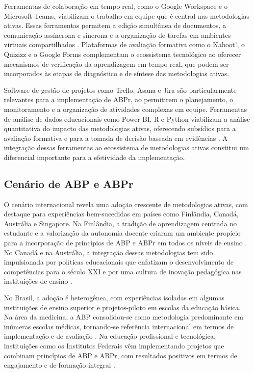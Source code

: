 Ferramentas de colaboração em tempo real, como o Google Workspace e o Microsoft Teams, viabilizam o trabalho em equipe que é central nas metodologias ativas. Essas ferramentas permitem a edição simultânea de documentos, a comunicação assíncrona e síncrona e a organização de tarefas em ambientes virtuais compartilhados \cite{SELWYN2022}. Plataformas de avaliação formativa como o Kahoot!, o Quizizz e o Google Forms complementam o ecossistema tecnológico ao oferecer mecanismos de verificação da aprendizagem em tempo real, que podem ser incorporados às etapas de diagnóstico e de síntese das metodologias ativas.

Software de gestão de projetos como Trello, Asana e Jira são particularmente relevantes para a implementação de ABPr, ao permitirem o planejamento, o monitoramento e a organização de atividades complexas em equipe. Ferramentas de análise de dados educacionais como Power BI, R e Python viabilizam a análise quantitativa do impacto das metodologias ativas, oferecendo subsídios para a avaliação formativa e para a tomada de decisão baseada em evidências \cite{ALMEIDA2024}. A integração dessas ferramentas ao ecossistema de metodologias ativas constitui um diferencial importante para a efetividade da implementação.

\subsection{Cenário de ABP e ABPr}
\label{subsec:cenario_abp_abpr}

O cenário internacional revela uma adoção crescente de metodologias ativas, com destaque para experiências bem-sucedidas em países como Finlândia, Canadá, Austrália e Singapore. Na Finlândia, a tradição de aprendizagem centrada no estudante e a valorização da autonomia docente criaram um ambiente propício para a incorporação de princípios de ABP e ABPr em todos os níveis de ensino \cite{BONWELL1991}. No Canadá e na Austrália, a integração dessas metodologias tem sido impulsionada por políticas educacionais que enfatizam o desenvolvimento de competências para o século XXI e por uma cultura de inovação pedagógica nas instituições de ensino \cite{BARRON1998}.

No Brasil, a adoção é heterogênea, com experiências isoladas em algumas instituições de ensino superior e projetos-piloto em escolas da educação básica. Na área da medicina, a ABP consolidou-se como metodologia predominante em inúmeras escolas médicas, tornando-se referência internacional em termos de implementação e de avaliação \cite{GOMES2009}. Na educação profissional e tecnológica, instituições como os Institutos Federais vêm implementando projetos que combinam princípios de ABP e ABPr, com resultados positivos em termos de engajamento e de formação integral \cite{SANTOS2019}.

